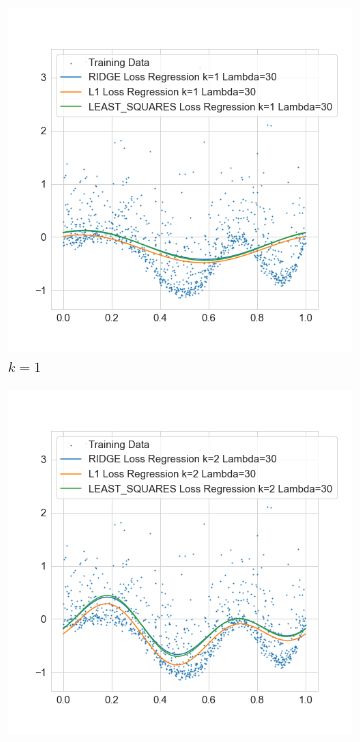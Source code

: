 \documentclass{./tufte-handout}
\begin{document}
\begin{enumerate}[(a)]
\begin{enumerate}
    \begin{figure}[!ht]
        \centering
        \begin{subfigure}[b]{.5\textwidth}
          \centering
          \includegraphics[width=1.2\linewidth]{../figures/l1_vs_ridge_regression_vs_least_squares_k_1_lambda_30.png}
          \caption{$k=1$}
        \end{subfigure}%
        \hfill
        \begin{subfigure}[b]{.5\textwidth}
          \centering
          \includegraphics[width=1.2\linewidth]{../figures/l1_vs_ridge_regression_vs_least_squares_k_2_lambda_30.png}

\end{subfigure}
\end{figure}
\end{enumerate}
\end{enumerate}
\end{document}
